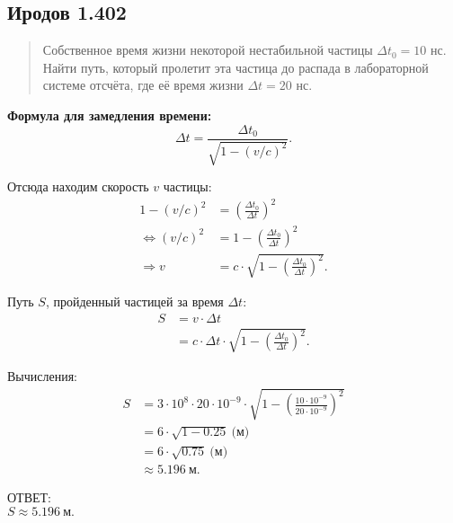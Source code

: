 \subsection*{Иродов 1.402}

\setcounter{equation}{0}

\begin{abstract}
Собственное время жизни некоторой нестабильной частицы $\Delta t_0 = 10$ нс. Найти путь, который пролетит эта частица до распада в лабораторной системе отсчёта, где её время жизни $\Delta t = 20$ нс.
\end{abstract}

\noindent\hrulefill

\textbf{Формула для замедления времени:}
\begin{equation*}
\Delta t = \frac{\Delta t_0}{\sqrt{1 - (v/c)^2}}.
\end{equation*}

Отсюда находим скорость $v$ частицы:
\begin{align*}
1 - (v/c)^2 &= \left(\frac{\Delta t_0}{\Delta t}\right)^2 \\
\Longleftrightarrow  (v/c)^2 &= 1 - \left(\frac{\Delta t_0}{\Delta t}\right)^2 \\
\Longrightarrow v &= c \cdot \sqrt{1 - \left(\frac{\Delta t_0}{\Delta t}\right)^2}.
\end{align*}

Путь $S$, пройденный частицей за время $\Delta t$:
\begin{align*}
S &= v \cdot \Delta t \\
  &= c \cdot \Delta t \cdot \sqrt{1 - \left(\frac{\Delta t_0}{\Delta t}\right)^2}.
\end{align*}

Вычисления:
\begin{align*}
S &= 3 \cdot 10^8 \cdot 20 \cdot 10^{-9} \cdot \sqrt{1 - \left(\frac{10 \cdot 10^{-9}}{20 \cdot 10^{-9}}\right)^2} \\
  &= 6 \cdot \sqrt{1 - 0.25} \ \text{(м)} \\
  &= 6 \cdot \sqrt{0.75} \ \text{(м)} \\
  &\approx 5.196 \ \text{м}.
\end{align*}


ОТВЕТ: \\
\(S \approx 5.196 \ \text{м}.\)